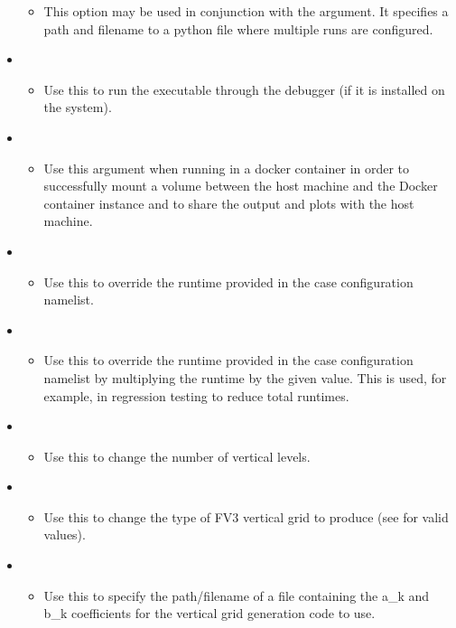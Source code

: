 \begin{itemize}
\begin{itemize}
	\item This option may be used in conjunction with the  argument. It specifies a path and filename to a python file where multiple runs are configured.
	\end{itemize}
\item {}
	\begin{itemize}
	\item Use this to run the executable through the  debugger (if it is installed on the system).
	\end{itemize}
\item {}
	\begin{itemize}
	\item Use this argument when running in a docker container in order to successfully mount a volume between the host machine and the Docker container instance and to share the output and plots with the host machine.
	\end{itemize}
\item {}
	\begin{itemize}
	\item Use this to override the runtime provided in the case configuration namelist.
	\end{itemize}
\item {}
	\begin{itemize}
	\item Use this to override the runtime provided in the case configuration namelist by multiplying the runtime by the given value. This is used, for example, in regression testing to reduce total runtimes.
	\end{itemize}
\item \execout{-{}-levels [-l}
	\begin{itemize}
	\item Use this to change the number of vertical levels.
	\end{itemize}
\item {}
	\begin{itemize}
	\item Use this to change the type of FV3 vertical grid to produce (see  for valid values).
	\end{itemize}
\item {}
	\begin{itemize}
	\item Use this to specify the path/filename of a file containing the a\_k and b\_k coefficients for the vertical grid generation code to use.

\end{itemize}
\end{itemize}
